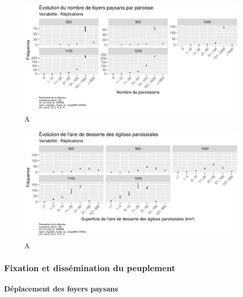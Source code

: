 \begin{figure}[H]
	\centering
	\includegraphics[width=\linewidth]{img/results_6_5_1/Paroisses_Compo_Haut.pdf}
	\caption{A}
	\label{}
\end{figure}
\begin{figure}[H]
	\centering
	\includegraphics[width=\linewidth]{img/results_6_5_1/Paroisses_Superficie_Haut.pdf}
	\caption{A}
	\label{}
\end{figure}


\subsubsection{Fixation et dissémination du peuplement}

\paragraph{Déplacement des foyers paysans}~\\

